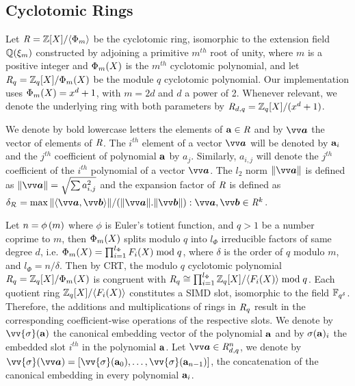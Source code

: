 \subsection{Cyclotomic Rings}

Let $\mathit{R} = \mathbb{Z}[X]/\langle {\Phi_{m}} \rangle$ be the cyclotomic ring, isomorphic to the extension field $\mathbb{Q}(\xi_m)$ constructed by adjoining a primitive $m^{th}$ root of unity, where $m$ is a positive integer and ${\Phi_{m}}(X)$ is the $m^{th}$ cyclotomic polynomial, and let $\mathit{R}_q=\mathbb{Z}_q[X]/{\Phi_{m}}(X)$ be the module $q$ cyclotomic polynomial. Our implementation uses ${\Phi_{m}}(X) = x^d+1$, with $m=2d$ and $d$ a power of 2. Whenever relevant, we denote the underlying ring with both parameters by $\mathit{R}_{d,q}=\mathbb{Z}_q[X]/(x^d+1)$.

We denote by bold lowercase letters the elements of $\mathbf{a} \in \mathit{R}$ and by $\pv{a}$ the vector of elements of $\mathit{R}$. The $i^{th}$ element of a vector $\pv{a}$ will be denoted by $\mathbf{a}_i$ and the $j^{th}$ coefficient of polynomial $\mathbf{a}$ by $a_j$. Similarly, $a_{i,j}$ will denote the $j^{th}$ coefficient of the $i^{th}$ polynomial of a vector $\pv{a}$. The $l_2$ norm $\|\pv{a}\|$ is defined as $\|\pv{a}\|=\sqrt{\sum a_{i,j}^2}$ and the expansion factor of $\mathit{R}$ is defined as $\expfactor = \max{\|\inprod{\pv{a}}{\pv{b}}\|/(\|\pv{a}\|.\|\pv{b}\|) : \pv{a}, \pv{b} \in \intring^k}$. 

Let $n=\phi\left(m\right)$ where $\phi$ is Euler’s totient function, and $q > 1$ be a number coprime to $m$, then ${\Phi_{m}}(X)$ splits modulo $q$ into $l_{\Phi}$ irreducible factors of same degree $d$, i.e. ${\Phi_{m}}(X) = \prod_{i=1}^{l_{\Phi}} F_i(X) \bmod q$, where $\delta$ is the order of $q$ modulo $m$, and $l_{\Phi} = n/\delta$. Then by \ac{CRT}, the modulo $q$ cyclotomic polynomial $\mathit{R}_q = \mathbb{Z}_q[X]/{\Phi_{m}}(X)$ is congruent with $\mathit{R}_q \cong \prod_{i=1}^{l_{\Phi}} \mathbb{Z}_q[X]/\langle F_i(X) \rangle \bmod q$. Each quotient ring $\mathbb{Z}_q[X]/\langle F_i(X) \rangle$ constitutes a \ac{SIMD} slot, isomorphic to the field $\mathbb{F}_{q^{\delta}}$. Therefore, the additions and multiplications of rings in $\mathit{R}_q$ result in the corresponding coefficient-wise operations of the respective slots. We denote by $\vv{\sigma}(\pa)$ the canonical embedding vector of the polynomial $\mathbf{a}$ and by $\sigma(\mathbf{a})_i$ the embedded slot $i^{th}$ in the polynomial $\mathbf{a}$. Let $\pv{a} \in \intring^n_{d,q}$, we denote by $\vv{\sigma}(\pv{a}) = [\vv{\sigma}(\pa_0),\ldots,\vv{\sigma}(\pa_{n-1})]$, the concatenation of the canonical embedding in every polynomial $\mathbf{a}_i$. 

